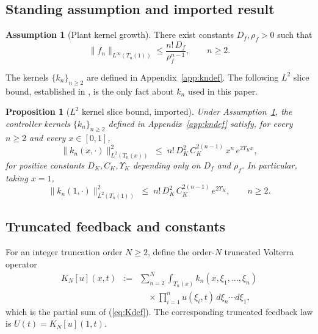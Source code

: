 \documentclass[amsthm]{autart}
\theoremstyle{plain}
\newtheorem{proposition}{Proposition}
\theoremstyle{definition}
\newtheorem{assumption}{Assumption}
\newcommand{\Linf}{L^\infty}
\newcommand{\Ltwo}{L^2}
\begin{document}
\subsection{Standing assumption and imported result}\label{sec:assumption}

\begin{assumption}[Plant kernel growth]\label{ass:fnbound}
There exist constants $D_f, \rho_f > 0$ such that
\begin{equation}
\|f_n\|_{\Linf(T_n(1))} \le \frac{n!\, D_f}{\rho_f^{n-1}}, \qquad n \ge 2.
\label{eq:fnbound}
\end{equation}
\end{assumption}

The kernels $\{k_n\}_{n \ge 2}$ are defined in Appendix~\ref{app:kndef}. The following $\Ltwo$ slice bound, established in \cite{krstic2026feedbacklinearizationhyperbolicpdes}, is the only fact about $k_n$ used in this paper.

\begin{proposition}[$\Ltwo$ kernel slice bound, imported]\label{prop:L2bound}
Under Assumption~\ref{ass:fnbound}, the controller kernels $\{k_n\}_{n\ge 2}$ defined in Appendix~\ref{app:kndef} satisfy, for every $n \ge 2$ and every $x \in [0,1]$,
\begin{equation}
\|k_n(x,\cdot)\|_{\Ltwo(T_n(x))}^2 \;\le\; n!\, D_K^2\, C_K^{2(n-1)}\, x^n\, e^{2\Upsilon_K x},
\label{eq:knL2}
\end{equation}
for positive constants $D_K, C_K, \Upsilon_K$ depending only on $D_f$ and $\rho_f$. In particular, taking $x = 1$,
\begin{equation}
\|k_n(1,\cdot)\|_{\Ltwo(T_n(1))}^2 \;\le\; n!\, D_K^2\, C_K^{2(n-1)}\, e^{2\Upsilon_K}, \qquad n \ge 2.
\label{eq:knL2_endpoint}
\end{equation}
\end{proposition}

\subsection{Truncated feedback and constants}\label{sec:truncfeedback}

For an integer truncation order $N \ge 2$, define the order-$N$ truncated Volterra operator
\begin{eqnarray}
K_N[u](x,t) &:=& \sum_{n=2}^N \int_{T_n(x)} k_n(x,\xi_1,\ldots,\xi_n) \nonumber \\
&& \quad \times \prod_{i=1}^n u(\xi_i,t)\, d\xi_n \cdots d\xi_1,
\label{eq:KNdef}
\end{eqnarray}
which is the partial sum of (\ref{eq:Kdef}). The corresponding truncated feedback law is $U(t) = K_N[u](1,t)$.
\end{document}
